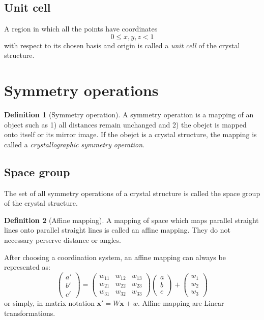 \documentclass{amsart}
\newcommand{\bfx}{\mathbf{x}}
\theoremstyle{remark}
\theoremstyle{remark}
\theoremstyle{definition}
\newtheorem*{definition}{Definition}
\begin{document}
\subsection*{Unit cell}
A region in which all the points have coordinates \[0 \leq x,y,z < 1\]
with respect to its chosen basis and origin is called a \emph{unit cell} of the crystal structure.

\vspace{10pt}
\section*{Symmetry operations}

\begin{definition}
    [Symmetry operation]
    A symmetry operation is a mapping of an object such as 1) all distances remain unchanged and 2) the obejct is mapped onto itself or its mirror image.
    If the obejct is a crystal structure, the mapping is called a \emph{crystallographic symmetry operation}.
\end{definition}

\subsection*{Space group}
The set of all symmetry operations of a crystal structure is called the space group of the crystal structure.

\vspace{10pt}

\begin{definition}
    [Affine mapping]
    A mapping of space which maps parallel straight lines onto parallel straight lines is called an affine mapping. They do not necessary perserve 
    distance or angles.
\end{definition}

After choosing a coordination system, an affine mapping can always be represented as:
\begin{equation*}
    \left( \begin{matrix}
        a'\\b'\\c'
    \end{matrix} \right)  = \left( \begin{matrix}
        w_{11} & w_{12} & w_{13} \\
        w_{21} & w_{22} & w_{23} \\
        w_{31} & w_{32} & w_{33}
    \end{matrix} \right) \left( \begin{matrix}
        a\\b\\c
    \end{matrix} \right)+ \left( \begin{matrix}
        w_1\\w_2\\w_3
    \end{matrix} \right)
\end{equation*}
or simply, in matrix notation $\bfx' = W\bfx + w$. Affine mapping are Linear transformations.
\end{document}
